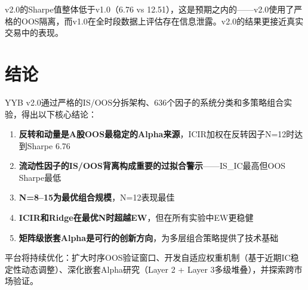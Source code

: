 \documentclass[11pt,a4paper]{ctexart}
\begin{document}
v2.0的Sharpe值整体低于v1.0（6.76 vs 12.51），这是预期之内的——v2.0使用了严格的OOS隔离，而v1.0在全时段数据上评估存在信息泄露。v2.0的结果更接近真实交易中的表现。

\section{结论}

YYB v2.0通过严格的IS/OOS分拆架构、636个因子的系统分类和多策略组合实验，得出以下核心结论：

\begin{enumerate}[nosep]
    \item \textbf{反转和动量是A股OOS最稳定的Alpha来源}，ICIR加权在反转因子N=12时达到Sharpe 6.76
    \item \textbf{流动性因子的IS/OOS背离构成重要的过拟合警示}——IS\_IC最高但OOS Sharpe最低
    \item \textbf{N=8--15为最优组合规模}，N=12表现最佳
    \item \textbf{ICIR和Ridge在最优N时超越EW}，但在所有实验中EW更稳健
    \item \textbf{矩阵级嵌套Alpha是可行的创新方向}，为多层组合策略提供了技术基础
\end{enumerate}

平台将持续优化：扩大时序OOS验证窗口、开发自适应权重机制（基于近期IC稳定性动态调整）、深化嵌套Alpha研究（Layer 2 + Layer 3多级堆叠），并探索跨市场验证。
\end{document}
